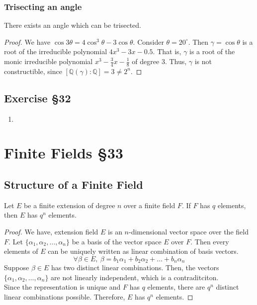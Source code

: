 \subsubsection{Trisecting an angle}
\begin{theorem}
	There exists an angle which can be trisected.
\end{theorem}
\begin{proof}
	We have $\cos 3\theta = 4\cos^3 \theta - 3\cos \theta$.
	Consider $\theta = 20^\circ$.
	Then $\gamma = \cos \theta$ is a root of the irreducible polynomial $4x^3-3x-0.5$.
	That is, $\gamma$ is a root of the monic irreducible polynomial $x^3-\frac{3}{4}x-\frac{1}{8}$ of degree $3$.
	Thus, $\gamma$ is not constructible, since $[\mathbb{Q}(\gamma) : \mathbb{Q}] = 3 \ne 2^n$.
\end{proof}
\subsection{Exercise \S32}
\begin{enumerate}
	\item
\end{enumerate}

\section{Finite Fields \S33}
\subsection{Structure of a Finite Field}
\begin{theorem}
	Let $E$ be a finite extension of degree $n$ over a finite field $F$.
	If $F$ has $q$ elements, then $E$ has $q^n$ elements.
\end{theorem}
\begin{proof}
	We have, extension field $E$ is an $n$-dimensional vector space over the field $F$.
	Let $\{ \alpha_1, \alpha_2,\dots, \alpha_n \}$ be a basis of the vector space $E$ over $F$.
	Then every elements of $E$ can be uniquely written as linear combination of basis vectors.
\begin{equation*}
 	\forall \beta \in E,\ \beta = b_1 \alpha_1 + b_2 \alpha_2 + \dots + b_n \alpha_n
\end{equation*}
	Suppose $\beta \in E$ has two distinct linear combinations.
	Then, the vectors $\{ \alpha_1, \alpha_2,\dots,\alpha_n\}$ are not linearly independent, which is a contraditciton.\\
	
	Since the representation is unique and $F$ has $q$ elements, there are $q^n$ distinct linear combinations possible.
	Therefore, $E$ has $q^n$ elements.
\end{proof}

